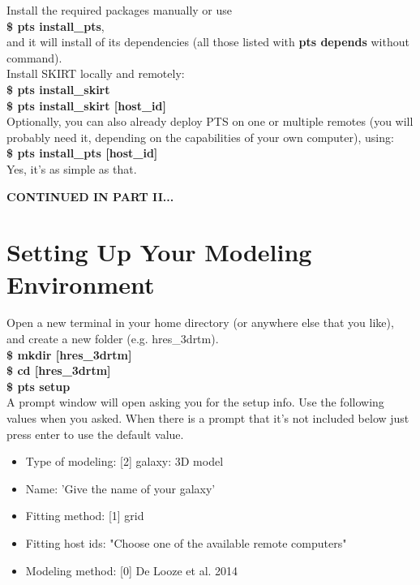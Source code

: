 \documentclass[15pt,a4paper,oneside,openright]{report}
\begin{document}
Install the required packages manually or use\\

\textbf{\$ pts install\_pts},\\

and it will install of its dependencies (all those listed with \textbf{pts depends} without command).\\

Install SKIRT locally and remotely:\\

\textbf{\$ pts install\_skirt}\\
\textbf{\$ pts install\_skirt [host\_id]}\\

Optionally, you can also already deploy PTS on one or multiple remotes (you will probably need it, depending on the capabilities of your own computer), using:\\

\textbf{\$ pts install\_pts [host\_id]}\\

Yes, it's as simple as that.

\begin{center}
\textbf{CONTINUED IN PART II...}
\end{center}

\part{Setting Up Your Modeling Environment}


Open a new terminal in your home directory (or anywhere else that you like), and create a new folder (e.g. hres\_3drtm).\\

\textbf{\$ mkdir [hres\_3drtm]}\\

\textbf{\$ cd [hres\_3drtm]}\\

\textbf{\$ pts setup}\\

A prompt window will open asking you for the setup info. Use the following values 
when you asked. When there is a prompt that it's not included below just press enter
to use the default value.

\begin{itemize}
	\item Type of modeling: [2] galaxy: 3D model
	\item Name: 'Give the name of your galaxy'
	\item Fitting method: [1] grid
	\item Fitting host ids: "Choose one of the available remote computers"
	\item Modeling method: [0] De Looze et al. 2014
\end{itemize}
\end{document}
